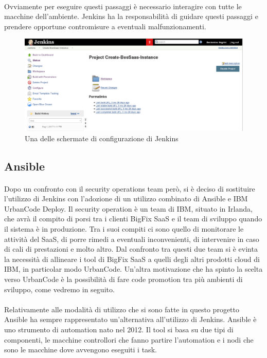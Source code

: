 \paragraph{}
Ovviamente per eseguire questi passaggi è necessario interagire con tutte le macchine dell'ambiente. Jenkins ha la responsabilità di guidare questi passaggi e prendere opportune contromisure a eventuali malfunzionamenti. 
\begin{figure}[h]
	\centering
	\includegraphics[width=0.7\linewidth]{capitoli/imgs/jenkisProj}
	\caption{Una delle schermate di configurazione di Jenkins}
	\label{fig:jenkisproj}
\end{figure}

\subsection{Ansible}
\paragraph{}
Dopo un confronto con il security operations team però, si è deciso di sostituire l'utilizzo di Jenkins con l'adozione di un utilizzo combinato di Ansible e IBM UrbanCode Deploy. Il security operation è un team di IBM, situato in Irlanda, che avrà il compito di porsi tra i clienti BigFix SaaS e il team di sviluppo quando il sistema è in produzione. Tra i suoi compiti ci sono quello di monitorare le attività del SaaS, di porre rimedi a eventuali inconvenienti, di intervenire in caso di cali di prestazioni e molto altro. Dal confronto tra questi due team si è evinta la necessità di allineare i tool di BigFix SaaS a quelli degli altri prodotti cloud di IBM, in particolar modo UrbanCode. Un'altra motivazione che ha spinto la scelta verso UrbanCode è la possibilità di fare code promotion tra più ambienti di sviluppo, come vedremo in seguito. 
\paragraph{}
Relativamente alle modalità di utilizzo che si sono fatte in questo progetto Ansible ha sempre rappresentato un'alternativa all'utilizzo di Jenkins. Ansible è uno strumento di automation nato nel 2012. Il tool si basa su due tipi di componenti, le macchine controllori che fanno partire l'automation e i nodi che sono le macchine dove avvengono eseguiti i task. 
